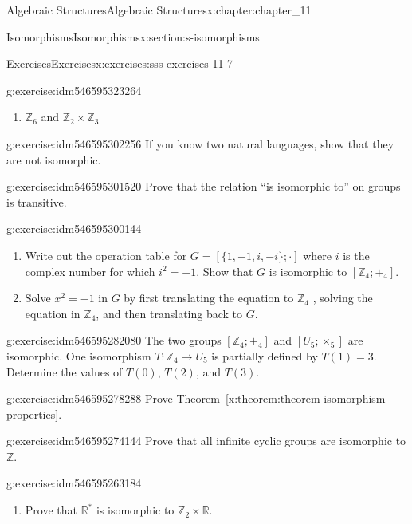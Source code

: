 \documentclass[oneside,10pt,]{book}
\newcommand{\xreffont}{\relax}
\numberwithin{equation}{section}
\begin{document}
\begin{chapterptx}{Algebraic Structures}{}{Algebraic Structures}{}{}{x:chapter:chapter_11}
\begin{sectionptx}{Isomorphisms}{}{Isomorphisms}{}{}{x:section:s-isomorphisms}
\begin{exercises-subsection}{Exercises}{}{Exercises}{}{}{x:exercises:sss-exercises-11-7}
\begin{divisionexercise}{1}{}{}{g:exercise:idm546595323264}
\begin{enumerate}[label=(\alph*)]
\item{}\(\mathbb{Z}_6\) and \(\mathbb{Z}_2\times  \mathbb{Z}_3\)%
\end{enumerate}
%
\end{divisionexercise}%
\begin{divisionexercise}{2}{}{}{g:exercise:idm546595302256}%
If you know two natural languages, show that they are not isomorphic.%
\end{divisionexercise}%
\begin{divisionexercise}{3}{}{}{g:exercise:idm546595301520}%
Prove that the relation ``is isomorphic to'' on groups is transitive.%
\end{divisionexercise}%
\begin{divisionexercise}{4}{}{}{g:exercise:idm546595300144}%
%
\begin{enumerate}[label=(\alph*)]
\item{}Write out the operation table for \(G = [\{1, -1, i, -i \}; \cdot ]\) where \(i\) is the complex number for which \(i^2 = - 1\). Show that \(G\) is isomorphic to \(\left[\mathbb{Z}_4;+_4\right]\).%
\item{}Solve \(x^2= -1\) in \(G\) by first translating the equation to \(\mathbb{Z}_4\) , solving the equation in \(\mathbb{Z}_4\), and then translating back to \(G\).%
\end{enumerate}
%
\end{divisionexercise}%
\begin{divisionexercise}{5}{}{}{g:exercise:idm546595282080}%
The two groups \(\left[\mathbb{Z}_4;+_4\right]\) and \(\left[U_5;\times _5\right]\) are isomorphic. One isomorphism \(T:\mathbb{Z}_4\to U_5\) is partially defined by \(T(1)=3\). Determine the values of \(T(0)\), \(T(2)\), and \(T(3)\).%
\end{divisionexercise}%
\begin{divisionexercise}{6}{}{}{g:exercise:idm546595278288}%
Prove \hyperref[x:theorem:theorem-isomorphism-properties]{Theorem~{\xreffont\ref{x:theorem:theorem-isomorphism-properties}}}.%
\end{divisionexercise}%
\begin{divisionexercise}{7}{}{}{g:exercise:idm546595274144}%
Prove that all infinite cyclic groups are isomorphic to \(\mathbb{Z}\).%
\end{divisionexercise}%
\begin{divisionexercise}{8}{}{}{g:exercise:idm546595263184}%
%
\begin{enumerate}[label=(\alph*)]
\item{}Prove that \(\mathbb{R}^*\) is isomorphic to \(\mathbb{Z}_2 \times  \mathbb{R}\).%

\end{enumerate}
\end{divisionexercise}
\end{exercises-subsection}
\end{sectionptx}
\end{chapterptx}
\end{document}
